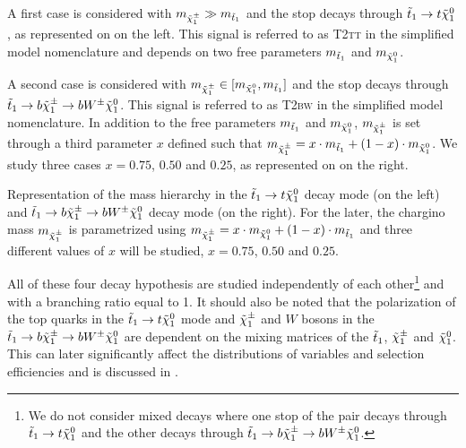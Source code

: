         A first case is considered with $m_{\tilde{\chi}_1^\pm} \gg m_{\tilde{t}_1}$ and the stop
        decays through $\tilde{t}_1 \rightarrow t \tilde{\chi}_1^0$, as represented on
         on the left. This signal is referred to as \textsc{T2tt}
        in the simplified model nomenclature and depends on two free parameters
        $m_{\tilde{t}_1}$ and $m_{\tilde{\chi}_1^0}$.

        A second case is considered with $m_{\tilde{\chi}_1^\pm} \in [m_{\tilde{\chi}_1^0},
        m_{\tilde{t}_1}]$ and the stop decays through $\tilde{t}_1 \rightarrow b \tilde{\chi}_1^\pm
        \rightarrow b W^{\pm} \tilde{\chi}_1^0$. This signal is referred to as \textsc{T2bw}
        in the simplified model nomenclature. In addition to the free  parameters
        $m_{\tilde{t}_1}$ and $m_{\tilde{\chi}_1^0}$, $m_{\tilde{\chi}_1^\pm}$ is set through a
        third parameter $x$ defined such that $m_{\tilde{\chi}_1^\pm} = x \cdot m_{\tilde{t}_1}
        + (1 - x) \cdot m_{\tilde{\chi}_1^0}$. We study three cases $x = 0.75$, $0.50$
        and $0.25$, as represented on  on the right.

                     {Representation of the mass hierarchy in the $\tilde{t}_1 \rightarrow t
                     \tilde{\chi}_1^0$ decay mode (on the left) and $\tilde{t}_1 \rightarrow b
                     \tilde{\chi}_1^\pm \rightarrow b W^{\pm} \tilde{\chi}_1^0 $ decay mode (on the
                     right). For the later, the chargino mass $m_{\tilde{\chi}_1^\pm}$ is
                     parametrized using $m_{\tilde{\chi}_1^\pm} = x \cdot m_{\tilde{\chi}_1^0}
                     + (1 - x) \cdot m_{\tilde{t}_1}$ and three different values of $x$ will
                     be studied, $x = 0.75$, $0.50$ and $0.25$.}

        All of these four decay hypothesis are studied independently
        of each other\footnote{We do not consider mixed decays where one stop of the pair
        decays through $\tilde{t}_1 \rightarrow t \tilde{\chi}_1^0$ and the other decays through
        $\tilde{t}_1 \rightarrow b \tilde{\chi}_1^\pm \rightarrow b W^{\pm} \tilde{\chi}_1^0$.} and with a
        branching ratio equal to 1. It should also be noted that the polarization of the
        top quarks in the $\tilde{t}_1 \rightarrow t \tilde{\chi}_1^0$ mode and $\tilde{\chi}_1^\pm$ and
        $W$ bosons in the $\tilde{t}_1 \rightarrow b \tilde{\chi}_1^\pm \rightarrow b W^{\pm}
        \tilde{\chi}_1^0$ are dependent on the mixing matrices of the $\tilde{t}_1$, $\tilde{\chi}_1^\pm$
        and $\tilde{\chi}_1^0$. This can later significantly affect the distributions of
        variables and selection efficiencies and is discussed in
        .


